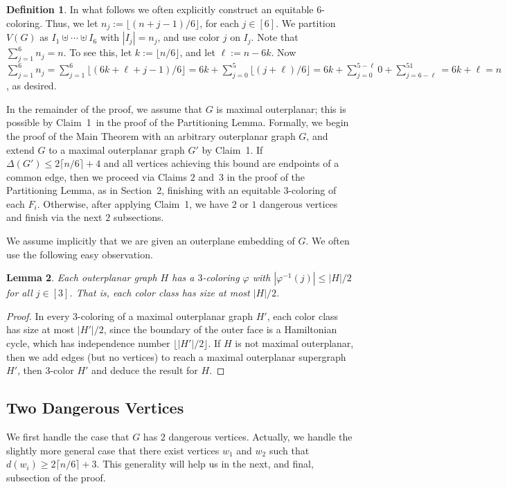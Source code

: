 \documentclass[11pt]{article}
\newtheorem{lem}{Lemma}
\theoremstyle{definition}
\newtheorem{defn}[lem]{Definition}
\newcommand\floor[1]{\lfloor#1\rfloor}
\newcommand\ceil[1]{\lceil#1\rceil}
\renewcommand\ge\geqslant
\renewcommand\le\leqslant
\newcommand\vph\varphi
\begin{document}
\begin{defn}
	\label{n_i-remark}
In what follows we often explicitly construct an equitable $6$-coloring.  Thus, we let $n_j:=\floor{(n+j-1)/6}$, for each $j\in[6]$.
We partition $V(G)$ as $I_1\uplus \cdots \uplus I_6$ with $|I_j|=n_j$, and use color $j$ on $I_j$.  Note that $\sum_{j=1}^6 n_j = n$.
	To see this, let $k:=\floor{n/6}$, and let $\ell:=n-6k$.  Now $\sum_{j=1}^6n_j=\sum_{j=1}^6\floor{(6k+\ell+j-1)/6} 
	= 6k+\sum_{j=0}^5\floor{(j+\ell)/6} = 6k+\sum_{j=0}^{5-\ell}0+\sum_{j=6-\ell}^51 = 6k+\ell=n$, as desired.
\end{defn}

In the remainder of the proof, we assume that $G$ is maximal outerplanar; this is possible by Claim~1~in the proof of the Partitioning Lemma.
Formally, we begin the proof of the Main Theorem with an arbitrary outerplanar graph $G$, and extend $G$ to a maximal outerplanar graph $G'$
by Claim~1.  If $\Delta(G')\le 2\ceil{n/6}+4$ and all vertices achieving this bound are endpoints of a common edge, then we proceed via Claims $2$ and~$3$
in the proof of the Partitioning Lemma, as in Section~2, finishing with an equitable $3$-coloring of each $F_i$.  Otherwise, after applying Claim~1, we
have $2$ or $1$ dangerous vertices and finish via the next $2$ subsections.

We assume implicitly that we are given an outerplane embedding of $G$.
We often use the following easy observation. 

\begin{lem}
	Each outerplanar graph $H$ has a $3$-coloring $\vph$ with $|\vph^{-1}(j)|\le |H|/2$ for all $j\in[3]$.
	That is, each color class has size at most $|H|/2$.
	\label{small-classes-obs}
\end{lem}
\begin{proof}
In every $3$-coloring of a maximal outerplanar graph $H'$, each color class has size at most $|H'|/2$, since the boundary of the outer face is a 
Hamiltonian cycle, which has independence number $\floor{|H'|/2}$.  
If $H$ is not maximal outerplanar, then we add edges (but no vertices) to reach a maximal outerplanar supergraph $H'$, then $3$-color $H'$ and
deduce the result for $H$.
\end{proof}

\subsection{Two Dangerous Vertices}
\label{two-dangerous-sec}
We first handle the case that $G$ has $2$ dangerous vertices.  Actually, we handle the slightly more general case that there exist vertices 
$w_1$ and $w_2$ such that $d(w_i)\ge 2\ceil{n/6}+3$.  This generality will help us in the next, and final, subsection of the proof.
\end{document}
